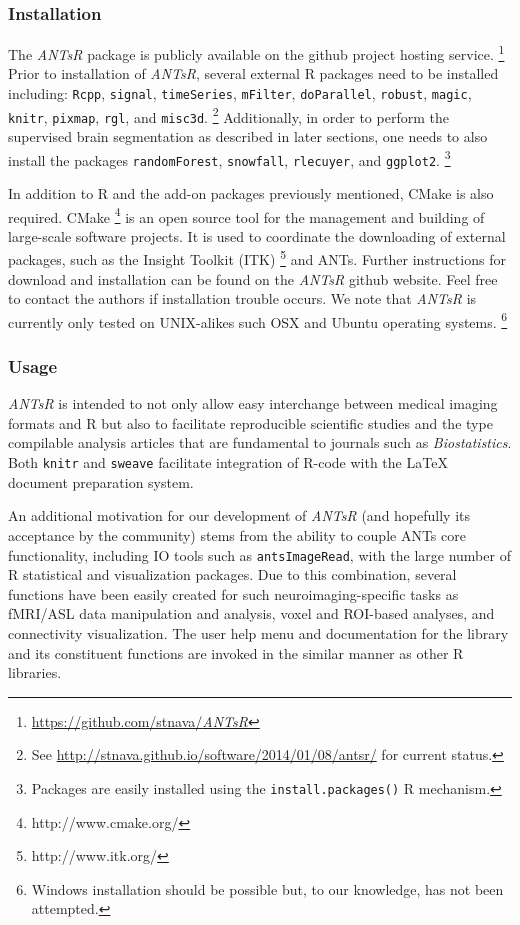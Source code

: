 \documentclass[preprint,authoryear,review,12pt]{elsarticle}
\begin{document}
\subsubsection{Installation}

The \textit{ANTsR} package is publicly available on the github project hosting service.%
\footnote{
\href{https://github.com/stnava/\textit{ANTsR}}{https://github.com/stnava/\textit{ANTsR}}
}
Prior to installation of \textit{ANTsR}, several external R packages
need to be installed including: \verb#Rcpp#, \verb#signal#, \verb#timeSeries#, 
\verb#mFilter#, \verb#doParallel#, \verb#robust#, \verb#magic#, \verb#knitr#, \verb#pixmap#, 
\verb#rgl#, and \verb#misc3d#.%
\footnote{
See \href{http://stnava.github.io/software/2014/01/08/antsr/}{http://stnava.github.io/software/2014/01/08/antsr/} for current status.}
Additionally, in order
to perform the supervised brain segmentation as described 
in later sections, one needs to also install the packages
\verb#randomForest#, \verb#snowfall#, \verb#rlecuyer#,
and \verb#ggplot2#.%
\footnote{
Packages are easily installed using the {\tt install.packages()} R mechanism.
} 

In addition to R and the add-on packages previously mentioned, CMake is also 
required.  CMake%
\footnote{
http://www.cmake.org/
}
is an open source tool for the management and building of 
large-scale software projects.  It is used
to coordinate the downloading of external packages,
such as the Insight Toolkit (ITK)%
\footnote{
http://www.itk.org/
}
and ANTs.  Further instructions for download and
installation can be found on the \textit{ANTsR} github website.  Feel
free to contact the authors if installation trouble occurs.  We note
that \textit{ANTsR} is currently only tested on UNIX-alikes such OSX and Ubuntu
operating systems.%
\footnote{Windows installation should be possible
but, to our knowledge, has not been attempted.}

\subsubsection{Usage}
\textit{ANTsR} is intended to not only allow easy interchange between
medical imaging formats and R but also to facilitate
reproducible scientific studies and the type compilable analysis
articles that are fundamental to journals such as
\textit{Biostatistics}.  Both \verb#knitr# and \verb#sweave#
facilitate integration of R-code with the LaTeX document
preparation system.  

An additional motivation for our development of \textit{ANTsR} (and
hopefully its acceptance by the community) 
stems from the ability to couple ANTs core 
functionality, including IO tools such as \verb#antsImageRead#, 
with the large number of R statistical and
visualization packages.  Due to this combination, several
functions have been easily created for such neuroimaging-specific 
tasks as fMRI/ASL data manipulation and analysis,
voxel and ROI-based  analyses,
and connectivity visualization. %
The user help menu and documentation for the library  and its
constituent functions are invoked in the similar manner as other
R libraries.
\end{document}
